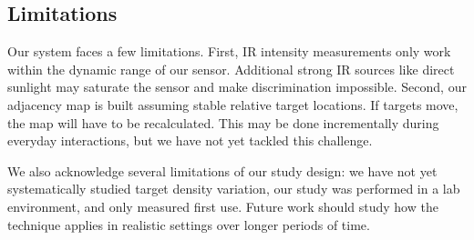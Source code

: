 
\subsection{Limitations}

Our system faces a few limitations. First, IR intensity measurements only work within the dynamic range of our sensor. Additional strong IR sources like direct sunlight may saturate the sensor and make discrimination impossible. Second, our adjacency map is built assuming stable relative target locations. If targets move, the map will have to be recalculated. This may be done incrementally during everyday interactions, but we have not yet tackled this challenge. 

We also acknowledge several limitations of our study design: we have not yet systematically studied target density variation, our study was performed in a lab environment, and only measured first use. Future work should study how the technique applies in realistic settings over longer periods of time.





